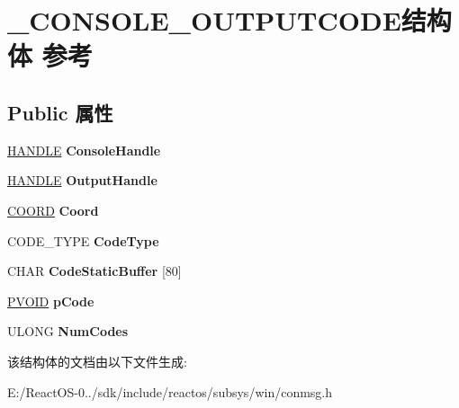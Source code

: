 \hypertarget{struct___c_o_n_s_o_l_e___o_u_t_p_u_t_c_o_d_e}{}\section{\+\_\+\+C\+O\+N\+S\+O\+L\+E\+\_\+\+O\+U\+T\+P\+U\+T\+C\+O\+D\+E结构体 参考}
\label{struct___c_o_n_s_o_l_e___o_u_t_p_u_t_c_o_d_e}
\subsection*{Public 属性}
\begin{DoxyCompactItemize}
\item 
\mbox{\label{struct___c_o_n_s_o_l_e___o_u_t_p_u_t_c_o_d_e_a8c679d54de42d14342f9073e01567e30}} 
\hyperlink{interfacevoid}{H\+A\+N\+D\+LE} {\bfseries Console\+Handle}
\item 
\mbox{\label{struct___c_o_n_s_o_l_e___o_u_t_p_u_t_c_o_d_e_af613e5ec222a1db3bcbc58cf0ef25a09}} 
\hyperlink{interfacevoid}{H\+A\+N\+D\+LE} {\bfseries Output\+Handle}
\item 
\mbox{\label{struct___c_o_n_s_o_l_e___o_u_t_p_u_t_c_o_d_e_ae75125f74b81ed95eb1bbd7b24a8cdda}} 
\hyperlink{struct___c_o_o_r_d}{C\+O\+O\+RD} {\bfseries Coord}
\item 
\mbox{\label{struct___c_o_n_s_o_l_e___o_u_t_p_u_t_c_o_d_e_a4f04f7d3bdf54d39b54b9b263ff866a7}} 
C\+O\+D\+E\+\_\+\+T\+Y\+PE {\bfseries Code\+Type}
\item 
\mbox{\label{struct___c_o_n_s_o_l_e___o_u_t_p_u_t_c_o_d_e_aa772ada2de782c8992c519338662713f}} 
C\+H\+AR {\bfseries Code\+Static\+Buffer} \mbox{[}80\mbox{]}
\item 
\mbox{\label{struct___c_o_n_s_o_l_e___o_u_t_p_u_t_c_o_d_e_a9026a8dae77f8af1fc5b5d7d2cbb4cf1}} 
\hyperlink{interfacevoid}{P\+V\+O\+ID} {\bfseries p\+Code}
\item 
\mbox{\label{struct___c_o_n_s_o_l_e___o_u_t_p_u_t_c_o_d_e_a5b43e051a82f5ba421f6aade1db054f4}} 
U\+L\+O\+NG {\bfseries Num\+Codes}
\end{DoxyCompactItemize}


该结构体的文档由以下文件生成\+:\begin{DoxyCompactItemize}
\item 
E\+:/\+React\+O\+S-\/0../sdk/include/reactos/subsys/win/conmsg.\+h\end{DoxyCompactItemize}
